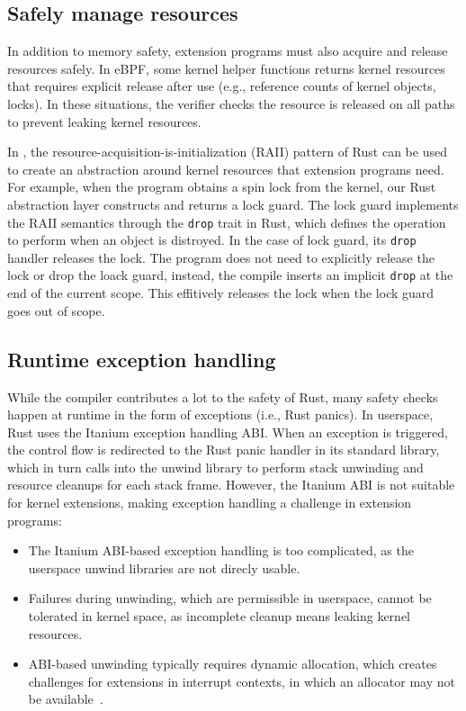 \subsection{Safely manage resources}
In addition to memory safety, extension programs must also acquire and release
    resources safely.
In eBPF, some kernel helper functions returns kernel resources that requires
    explicit release after use (e.g., reference counts of kernel objects,
    locks).
In these situations, the verifier checks the resource is released on all paths
    to prevent leaking kernel resources.

In \projname{}, the resource-acquisition-is-initialization (RAII) pattern of
    Rust can be used to create an abstraction around kernel resources that
    extension programs need.
For example, when the program obtains a spin lock from the kernel, our Rust
    abstraction layer constructs and returns a lock guard.
The lock guard implements the RAII semantics through the \texttt{drop} trait in
    Rust, which defines the operation to perform when an object is distroyed.
In the case of lock guard, its \texttt{drop} handler releases the lock.
The program does not need to explicitly release the lock or drop the loack
    guard, instead, the compile inserts an implicit \texttt{drop} at the end of
    the current scope. This effitively releases the lock when the lock guard
    goes out of scope.

\subsection{Runtime exception handling}
\label{principle:eh}
While the compiler contributes a lot to the safety of Rust, many safety checks
    happen at runtime in the form of exceptions (i.e., Rust panics).
In userspace, Rust uses the Itanium exception handling ABI.
When an exception is triggered, the control flow is redirected to the Rust
    panic handler in its standard library, which in turn calls into the unwind
    library to perform stack unwinding and resource cleanups for each stack
    frame.
However, the Itanium ABI is not suitable for kernel extensions, making
    exception handling a challenge in extension programs:
\begin{itemize}
    \item The Itanium ABI-based exception handling is too complicated, as the
        userspace unwind libraries are not direcly usable.
    \item Failures during unwinding, which are permissible in userspace, cannot
        be tolerated in kernel space, as incomplete cleanup means leaking
        kernel resources.
    \item ABI-based unwinding typically requires dynamic allocation, which
        creates challenges for extensions in interrupt contexts, in which an
        allocator may not be available~\cite{bpf-mempool-lwn}.
\end{itemize}


